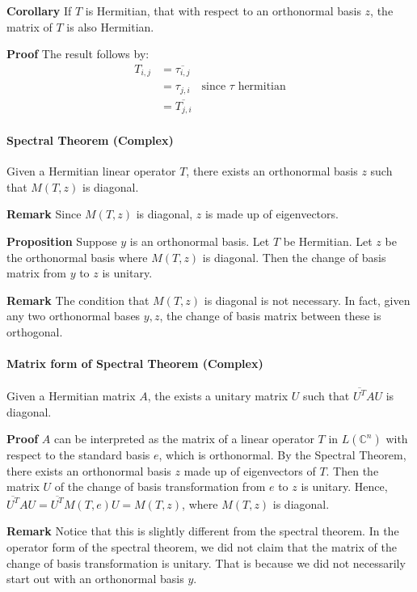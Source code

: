 \documentclass{article}
\begin{document}
\textbf{Corollary} If $T$ is Hermitian, that with respect to an orthonormal basis $z$, the matrix of $T$ is also Hermitian.

\textbf{Proof} The result follows by:
\begin{align*}
	T_{i,j} &= \overline{\tau_{i,j}} \\
	&= \tau_{j,i}\quad \text{since }\tau \text{ hermitian}\\
	&= \overline{T_{j,i}}
\end{align*}

\paragraph{Spectral Theorem (Complex)} Given a Hermitian linear operator $T$, there exists an orthonormal basis $z$ such that $M(T,z)$ is diagonal.

\textbf{Remark} Since $M(T,z)$ is diagonal, $z$ is made up of eigenvectors.

\textbf{Proposition} Suppose $y$ is an orthonormal basis. Let $T$ be Hermitian. Let $z$ be the orthonormal basis where $M(T,z)$ is diagonal. Then the change of basis matrix from $y$ to $z$ is unitary.

\textbf{Remark} The condition that $M(T,z)$ is diagonal is not necessary. In fact, given any two orthonormal bases $y,z$, the change of basis matrix between these is orthogonal.

\paragraph{Matrix form of Spectral Theorem (Complex)} Given a Hermitian matrix $A$, the exists a unitary matrix $U$ such that $\overline{U^T}AU$ is diagonal.

\textbf{Proof} $A$ can be interpreted as the matrix of a linear operator $T$ in $L(\mathbb{C}^n)$ with respect to the standard basis $e$, which is orthonormal. By the Spectral Theorem, there exists an orthonormal basis $z$ made up of eigenvectors of $T$. Then the matrix $U$ of the change of basis transformation from $e$ to $z$ is unitary.
Hence, $\overline{U^T}AU=\overline{U^T}M(T,e)U = M(T,z)$, where $M(T,z)$ is diagonal.

\textbf{Remark} Notice that this is slightly different from the spectral theorem. In the operator form of the spectral theorem, we did not claim that the matrix of the change of basis transformation is unitary. That is because we did not necessarily start out with an orthonormal basis $y$.
\end{document}
